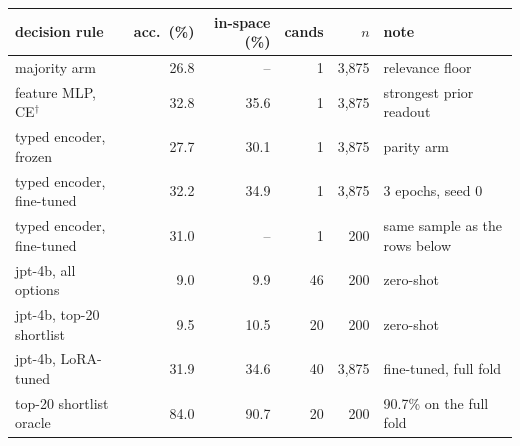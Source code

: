 {\setlength{\tabcolsep}{4.5pt}\begin{tabular}{lrrrrl}\toprule
decision rule & acc.\ (\%) & in-space (\%) & cands & $n$ & note \\\midrule
majority arm & 26.8 & -- & 1 & 3{,}875 & relevance floor \\
feature MLP, CE$^{\dagger}$ & 32.8 & 35.6 & 1 & 3{,}875 & strongest prior readout \\
typed encoder, frozen & 27.7 & 30.1 & 1 & 3{,}875 & parity arm \\
typed encoder, fine-tuned & 32.2 & 34.9 & 1 & 3{,}875 & 3 epochs, seed 0 \\
typed encoder, fine-tuned & 31.0 & -- & 1 & 200 & same sample as the rows below \\
jpt-4b, all options & 9.0 & 9.9 & 46 & 200 & zero-shot \\
jpt-4b, top-20 shortlist & 9.5 & 10.5 & 20 & 200 & zero-shot \\
jpt-4b, LoRA-tuned & 31.9 & 34.6 & 40 & 3{,}875 & fine-tuned, full fold \\
top-20 shortlist oracle & 84.0 & 90.7 & 20 & 200 & 90.7\% on the full fold \\
\bottomrule\end{tabular}}
